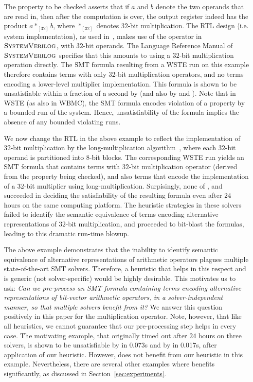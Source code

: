 The property to be checked asserts that if $a$ and $b$ denote the two
operands that are read in, then after the computation is over, the
output register indeed has the product $a *_{[32]} b$, where
$*_{[32]}$ denotes $32$-bit multiplication.  The RTL design
(i.e. system implementation), as used in~\cite{wste}, makes use of the
{\tt *} operator in $\textsc{SystemVerilog}$, with $32$-bit operands.  The Language
Reference Manual of $\textsc{SystemVerilog}$ specifies that this amounts to using a
$32$-bit multiplication operation directly.  The SMT formula resulting
from a WSTE run on this example therefore contains terms with only
$32$-bit multiplication operators, and no terms encoding a lower-level
multiplier implementation.  This formula is shown to be unsatisfiable
within a fraction of a second by {\boolector} (and also by {\cvcfour}
and {\zthree}).  Note that in WSTE (as also in WBMC), the SMT formula
encodes violation of a property by a bounded run of the system. Hence,
unsatisfiability of the formula implies the absence of any bounded
violating runs.

We now change the RTL in the above example to reflect the
implementation of $32$-bit multiplication by the long-multiplication
algorithm~\cite{long}, where each $32$-bit operand is partitioned into
$8$-bit blocks.  The corresponding WSTE run yields an SMT formula that
contains terms with $32$-bit multiplication operator (derived from the
property being checked), and also terms that encode the implementation
of a $32$-bit multiplier using long-multiplication.  Surpisingly, none
of {\boolector}, {\cvcfour} and {\zthree} succeeded in deciding the
satisfiability of the resulting formula even after $24$ hours on the
same computing platform.  The heuristic strategies in these solvers
failed to identify the semantic equivalence of terms encoding
alternative representations of $32$-bit multiplication, and proceeded
to bit-blast the formulas, leading to this dramatic run-time blowup.

The above example demonstrates that the inability to identify semantic
equivalence of alternative representations of arithmetic operators
plagues multiple state-of-the-art SMT solvers.  Therefore, a heuristic
that helps in this respect and is generic (not solver-specific) would
be highly desirable.  This motivates us to ask: \emph{Can we
pre-process an SMT formula containing terms encoding alternative
representations of bit-vector arithmetic operators, in a
solver-independent manner, so that multiple solvers benefit from it?}
We answer this question positively in this paper for the
multiplication operator.  Note, however, that like all heuristics, we
cannot guarantee that our pre-processing step helps in every case.
The motivating example, that originally timed out after $24$ hours on
three solvers, is shown to be unsatisfiable by {\zthree} in 0.073s and
by {\cvcfour} in 0.017s, after application of our heuristic. However,
{\boolector} does not benefit from our heuristic in this example.
Nevertheless, there are several other examples where {\boolector}
benefits significantly, as discussed in Section~\ref{sec:experiments}.

